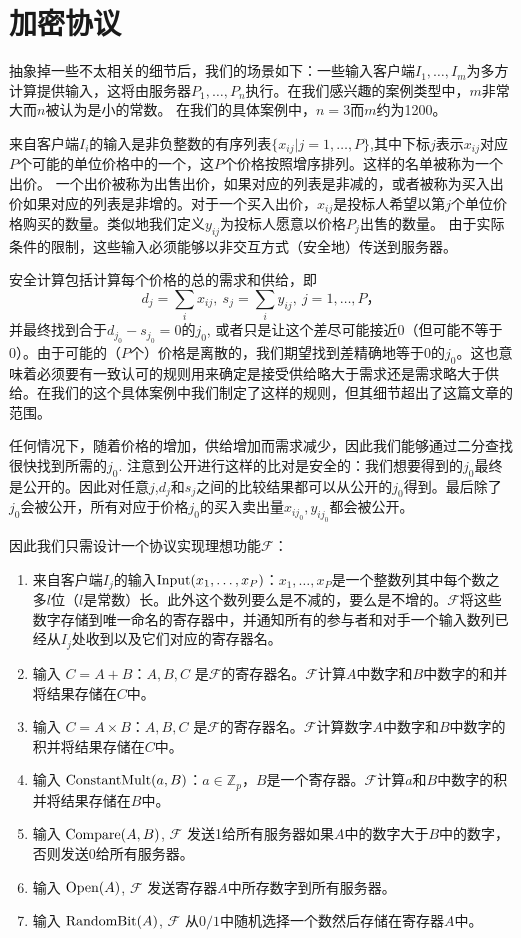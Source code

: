 \section{加密协议}
抽象掉一些不太相关的细节后，我们的场景如下：一些输入客户端$I_1,\dots,I_m$为多方计算提供输入，这将由服务器$P_1,\dots,P_n$执行。在我们感兴趣的案例类型中，$m$非常大而$n$被认为是小的常数。 在我们的具体案例中，$n=3$而$m$约为1200。

来自客户端$I_i$的输入是非负整数的有序列表$\{x_{ij}|j=1,\dots,P\}$,其中下标$j$表示$x_{ij}$对应$P$个可能的单位价格中的一个，这$P$个价格按照增序排列。这样的名单被称为一个出价。 一个出价被称为出售出价，如果对应的列表是非减的，或者被称为买入出价如果对应的列表是非增的。对于一个买入出价，$x_{ij}$是投标人希望以第$j$个单位价格购买的数量。类似地我们定义$y_{ij}$为投标人愿意以价格$P_j$出售的数量。 由于实际条件的限制，这些输入必须能够以非交互方式（安全地）传送到服务器。

安全计算包括计算每个价格的总的需求和供给，即
$$
d_j=\sum_{i}x_{ij},\ s_j=\sum_i y_{ij},\ j=1,\dots,P，
$$
并最终找到合于$d_{j_0}-s_{j_0}=0$的$j_0$, 或者只是让这个差尽可能接近0（但可能不等于0）。由于可能的（$P$个）价格是离散的，我们期望找到差精确地等于0的$j_0$。这也意味着必须要有一致认可的规则用来确定是接受供给略大于需求还是需求略大于供给。在我们的这个具体案例中我们制定了这样的规则，但其细节超出了这篇文章的范围。

任何情况下，随着价格的增加，供给增加而需求减少，因此我们能够通过二分查找很快找到所需的$j_0$. 注意到公开进行这样的比对是安全的：我们想要得到的$j_0$最终是公开的。因此对任意$j$,$d_j$和$s_j$之间的比较结果都可以从公开的$j_0$得到。最后除了$j_0$会被公开，所有对应于价格$j_0$的买入卖出量$x_{ij_0},y_{ij_0}$都会被公开。

因此我们只需设计一个协议实现理想功能$\mathcal{F}$：
\begin{enumerate}
	\item
	来自客户端$I_j$的输入$\textup{Input}(x_1,\dots,x_P)$：$x_1,\dots,x_P$是一个整数列其中每个数之多$l$位（$l$是常数）长。此外这个数列要么是不减的，要么是不增的。$\mathcal{F}$将这些数字存储到唯一命名的寄存器中，并通知所有的参与者和对手一个输入数列已经从$I_j$处收到以及它们对应的寄存器名。
	\item
	输入 $C=A+B$：$A,B,C$ 是$\mathcal{F}$的寄存器名。$\mathcal{F}$计算$A$中数字和$B$中数字的和并将结果存储在$C$中。
	\item 
	输入 $C=A\times B$：$A,B,C$ 是$\mathcal{F}$的寄存器名。$\mathcal{F}$计算数字$A$中数字和$B$中数字的积并将结果存储在$C$中。
	\item
	输入 $\textup{ConstantMult}(a,B)$：$a\in \mathbb{Z}_p$，$B$是一个寄存器。$\mathcal{F}$计算$a$和$B$中数字的积并将结果存储在$B$中。
	\item
	输入 $\textup{Compare}(A,B)$, $\mathcal{F}$ 发送1给所有服务器如果$A$中的数字大于$B$中的数字，否则发送0给所有服务器。
	\item 
	输入 $\textup{Open}(A)$, $\mathcal{F}$ 发送寄存器$A$中所存数字到所有服务器。
	\item 
	输入 $\textup{RandomBit}(A)$, $\mathcal{F}$ 从$0/1$中随机选择一个数然后存储在寄存器$A$中。
\end{enumerate}

